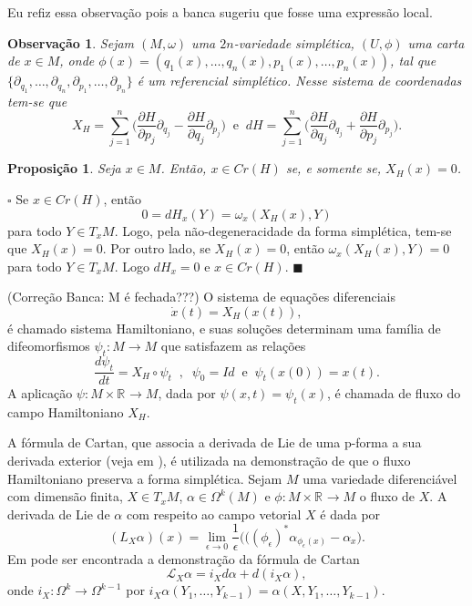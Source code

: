\documentclass[12pt]{book}
\newtheorem{observacao}[teorema]{Observação}
\newtheorem{proposicao}[teorema]{Proposição}
\newenvironment{prova}[1]{$\square$ #1}{\hfill$\blacksquare$}
\newcommand{\campohamiltoniano}[1]{X_{H}(#1)}
\newcommand{\campohamiltonianoabrev}{X_{H}}
\newcommand{\derivada}[2]{\frac{d #1}{d #2}}
\newcommand{\derivadaparcial}[2]{\frac{\partial #1}{\partial #2}}
\newcommand{\liederivada}[1]{\mathcal{L}_{#1}}
\newcommand{\pontoscriticos}[1]{\textit{Cr}(#1)}
\newcommand{\real}[1]{\mathbb{R}^{#1}}
\newcommand{\reta}{\real{}}
\newcommand{\alerta}[1]{{\color{red}#1}}
\newcommand{\correcaobanca}[1]{\alerta{(Correção Banca: #1)}}
\begin{document}
	\alerta{Eu refiz essa observação pois a banca sugeriu que fosse uma expressão local.}
	\begin{observacao}
		Sejam $(M, \omega)$ uma $2n$-variedade simplética, $(U, \phi)$ uma carta de $x\in M$, onde $\phi(x)=(q_{1}(x), \dots, q_{n}(x), p_{1}(x), \dots, p_{n}(x))$, tal que $\{\partial_{q_{1}}, \dots , \partial_{q_{n}}, \partial_{p_{1}}, \dots, \partial_{p_{n}} \}$ é um referencial simplético. Nesse sistema de coordenadas tem-se que 
		$$
		\campohamiltonianoabrev = \sum_{j=1}^{n}\Big(\derivadaparcial{H}{p_{j}}\partial_{q_{j}}  - \derivadaparcial{H}{q_{j}}\partial_{p_{j}}  \Big)\;\;\text{e}\;\; dH =  \sum_{j=1}^{n}\Big(\derivadaparcial{H}{q_{j}}\partial_{q_{j}}  + \derivadaparcial{H}{p_{j}}\partial_{p_{j}}  \Big).
		$$
	\end{observacao}
	
	\begin{proposicao}
		Seja $x\in M$. Então, $x\in \pontoscriticos{H}$ se, e somente se, $\campohamiltoniano{x}=0$.
	\end{proposicao}
	\begin{prova}
		Se $x\in \pontoscriticos{H}$, então 
		$$
		0=dH_{x}(Y)=\omega_{x}(\campohamiltonianoabrev(x), Y)
		$$
		para todo $Y\in T_{x}M$. Logo, pela não-degeneracidade da forma simplética, tem-se que $\campohamiltoniano{x} =0$. Por outro lado, se $\campohamiltoniano{x} =0$, então $\omega_{x}(\campohamiltonianoabrev(x), Y)=0$ para todo $Y\in T_{x}M$. Logo $dH_{x}=0$ e $x\in \pontoscriticos{H}$.
	\end{prova}
	
	\correcaobanca{M é fechada???}
	O sistema de equações diferenciais
	$$
		\dot{x}(t)=\campohamiltoniano{x(t)},
	$$
	é chamado sistema Hamiltoniano, e suas soluções determinam uma família de difeomorfismos $\psi_{t}:M\to M$ que satisfazem as relações 
	$$
	\derivada{\psi_{t}}{t}=\campohamiltonianoabrev\circ\psi_{t} \;\;, \;\; \psi_{0}=Id \;\;\text{e}\;\;  \psi_{t}(x(0)) = x(t).
	$$
	A aplicação $\psi: M\times \reta \to M$, dada por $\psi(x,t)=\psi_{t}(x)$, é chamada de fluxo do campo Hamiltoniano $\campohamiltonianoabrev$.
	
	A fórmula de Cartan, que associa a derivada de Lie de uma p-forma a sua derivada exterior (veja em \cite{nakahara}), é utilizada na demonstração de que o fluxo Hamiltoniano preserva a forma simplética. Sejam $M$ uma variedade diferenciável com dimensão finita, $X \in T_{x}M$, $\alpha \in \Omega^{k}(M)$ e $\phi:M\times \reta \to M$ o fluxo de $X$. A derivada de Lie de $\alpha$ com respeito ao campo vetorial $X$ é dada por
	$$
	(L_{X}\alpha)(x)=\lim\limits_{\epsilon\to 0} \frac{1}{\epsilon}\big( ((\phi_{\epsilon})^{*}\alpha_{\phi_{\epsilon}(x)} - \alpha_{x} \big).
	$$
	Em \cite{nakahara} pode ser encontrada a demonstração da fórmula de Cartan	
	$$
	\liederivada{X}\alpha = i_{X}d\alpha + d(i_{X}\alpha),
	$$
	onde $i_{X}:\Omega^{k} \to \Omega^{k-1}$ por $i_{X}\alpha(Y_{1}, \dots, Y_{k-1}) = \alpha(X, Y_{1}, \dots, Y_{k-1})$.	
	
\end{document}
